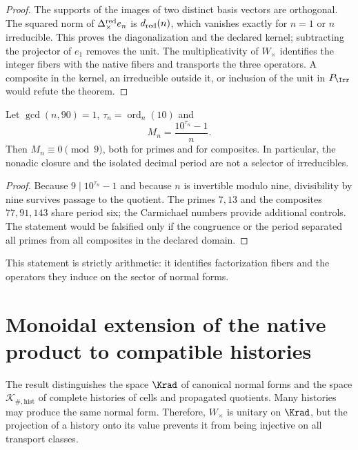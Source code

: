 \begin{proof}
The supports of the images of two distinct basis vectors are orthogonal.
The squared norm of
\(\Delta_\times^{\rm red}e_n\) is \(d_{\rm red}(n)\), which vanishes
exactly for \(n=1\) or \(n\) irreducible. This proves the diagonalization
and the declared kernel; subtracting the projector of \(e_1\) removes the unit.
The multiplicativity of \(W_\times\) identifies the integer fibers with the
native fibers and transports the three operators. A composite in the kernel,
an irreducible outside it, or inclusion of the unit in \(P_{\Irr}\)
would refute the theorem.
\end{proof}

\begin{proposition}
\label{int:pf84:B05}
Let \(\gcd(n,90)=1\),
\(\tau_n=\operatorname{ord}_n(10)\) and
\[
 M_n=\frac{10^{\tau_n}-1}{n}.
\]
Then \(M_n\equiv0\pmod9\), both for primes and for composites. In
particular, the nonadic closure and the isolated decimal period are not a
selector of irreducibles.
\end{proposition}

\begin{proof}
Because \(9\mid10^{\tau_n}-1\) and because \(n\) is invertible modulo nine, divisibility by nine survives passage to the quotient. The primes \(7,13\) and the composites \(77,91,143\) share period six; the Carmichael numbers provide additional controls. The statement would be falsified only if the congruence or the period separated all primes from all composites in the declared domain.
\end{proof}

This statement is strictly arithmetic: it identifies factorization
fibers and the operators they induce on the sector of normal
forms.

\ifdefined\HMTInternalTraceability
\section{Monoidal extension of the native product to compatible histories}
\label{int:pf84:SYN-05D-HIST}

The result distinguishes the space \(\Krad\) of canonical normal forms and
the space \(\mathcal K_{\#,\mathrm{hist}}\) of complete histories of
cells and propagated quotients.
Many histories may produce the same normal form. Therefore,
$W_\times$ is unitary on $\Krad$, but the projection of a history onto
its value prevents it from being injective on all transport classes.

